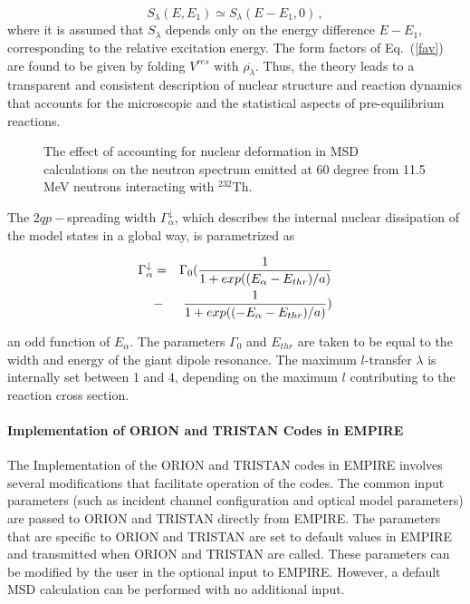 \begin{equation}
S_{\lambda}(E,E_{1})\simeq S_{\lambda}(E-E_{1},0)\,,  \label{slrpa}
\end{equation}
\noindent where it is assumed that $S_{\lambda}$ depends only on the energy
difference $E-E_{1}$, corresponding to the relative excitation energy.
The form factors of Eq.~(\ref{fav}) are found to be given by folding $V^{res}$
with $%
\overline{\rho_{\lambda}}$. Thus, the theory leads to a transparent and
consistent description of nuclear structure and reaction dynamics that
accounts for the microscopic and the statistical aspects of pre-equilibrium
reactions.

\begin{figure}[htbp]
\caption{The effect of accounting for nuclear deformation in MSD
calculations on the neutron spectrum emitted at 60 degree from 11.5 MeV
neutrons interacting with $^{232}$Th.}
\label{fig:Th-defMSD}
\end{figure}

The $2qp-$spreading width $\Gamma_{\alpha}^{\downarrow}$,
which describes the internal nuclear dissipation of the model states
in a global way, is parametrized as

\begin{eqnarray}
\Gamma_{\alpha}^{\downarrow}&=&\Gamma_{0}(\frac{1}{1+exp((E_{%
\alpha}-E_{thr})/a)}  \notag \\
&-&\frac{1}{1+exp((-E_{\alpha}-E_{thr})/a)})
\end{eqnarray}

\noindent an odd function of $E_{\alpha}$. The parameters $\Gamma_{0}$
and $E_{thr}$ are taken to be equal to the width and energy of the giant dipole
resonance. The maximum $l$-transfer $\lambda$ is internally set between 1
and 4, depending on the maximum $l$ contributing to the reaction cross
section.

\medskip

\paragraph{Implementation of ORION and TRISTAN%
 Codes in EMPIRE}

The Implementation of the ORION%
 and TRISTAN codes in EMPIRE involves several modifications that
facilitate operation of the codes. The common input parameters (such as
incident channel configuration and optical model parameters) are passed to
ORION and TRISTAN directly from EMPIRE. The parameters that are specific
to ORION and TRISTAN are set to default values in EMPIRE and transmitted
when ORION and TRISTAN are called. These parameters can be modified by
the user in the optional input to EMPIRE. However, a default MSD%
 calculation can be performed with no additional input.

